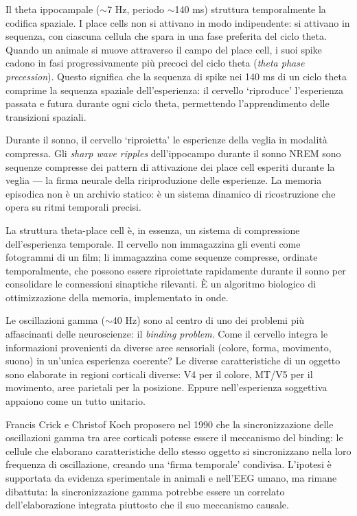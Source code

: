 \documentclass[12pt,a4paper,openany]{book}
\newcommand{\sezione}[1]{\vspace{1.2em}{\large\bfseries #1}\vspace{0.5em}\par}
\begin{document}
Il theta ippocampale ($\sim$7 Hz, periodo $\sim$140 ms) struttura temporalmente la codifica spaziale. I place cells non si attivano in modo indipendente: si attivano in sequenza, con ciascuna cellula che spara in una fase preferita del ciclo theta. Quando un animale si muove attraverso il campo del place cell, i suoi spike cadono in fasi progressivamente più precoci del ciclo theta (\textit{theta phase precession}). Questo significa che la sequenza di spike nei 140 ms di un ciclo theta comprime la sequenza spaziale dell'esperienza: il cervello `riproduce' l'esperienza passata e futura durante ogni ciclo theta, permettendo l'apprendimento delle transizioni spaziali.

Durante il sonno, il cervello `riproietta' le esperienze della veglia in modalità compressa. Gli \textit{sharp wave ripples} dell'ippocampo durante il sonno NREM sono sequenze compresse dei pattern di attivazione dei place cell esperiti durante la veglia — la firma neurale della ririproduzione delle esperienze. La memoria episodica non è un archivio statico: è un sistema dinamico di ricostruzione che opera su ritmi temporali precisi.

La struttura theta-place cell è, in essenza, un sistema di compressione dell'esperienza temporale. Il cervello non immagazzina gli eventi come fotogrammi di un film; li immagazzina come sequenze compresse, ordinate temporalmente, che possono essere riproiettate rapidamente durante il sonno per consolidare le connessioni sinaptiche rilevanti. È un algoritmo biologico di ottimizzazione della memoria, implementato in onde.

\sezione{Il gamma e il binding problem}

Le oscillazioni gamma ($\sim$40 Hz) sono al centro di uno dei problemi più affascinanti delle neuroscienze: il \textit{binding problem}. Come il cervello integra le informazioni provenienti da diverse aree sensoriali (colore, forma, movimento, suono) in un'unica esperienza coerente? Le diverse caratteristiche di un oggetto sono elaborate in regioni corticali diverse: V4 per il colore, MT/V5 per il movimento, aree parietali per la posizione. Eppure nell'esperienza soggettiva appaiono come un tutto unitario.

Francis Crick e Christof Koch proposero nel 1990 che la sincronizzazione delle oscillazioni gamma tra aree corticali potesse essere il meccanismo del binding: le cellule che elaborano caratteristiche dello stesso oggetto si sincronizzano nella loro frequenza di oscillazione, creando una `firma temporale' condivisa. L'ipotesi è supportata da evidenza sperimentale in animali e nell'EEG umano, ma rimane dibattuta: la sincronizzazione gamma potrebbe essere un correlato dell'elaborazione integrata piuttosto che il suo meccanismo causale.
\end{document}
